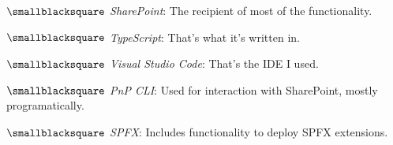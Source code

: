 \documentclass[10mm,letterpaper,notitlepage]{article}
\begin{document}
{{								\nopagebreak
								$\smallblacksquare$ \textit{SharePoint}: The recipient of most of the functionality.
								
								$\smallblacksquare$ \textit{TypeScript}: That's what it's written in.
								
								$\smallblacksquare$ \textit{Visual Studio Code}: That's the IDE I used.
								
								$\smallblacksquare$ \textit{PnP CLI}: Used for interaction with SharePoint, mostly programatically.
								
								$\smallblacksquare$ \textit{SPFX}: Includes functionality to deploy SPFX extensions.
								
								\setlength{\parindent}{\parindent-4mm}
							\par}
					\setlength{\parindent}{\parindent-4mm}
				\setlength{\parindent}{\parindent-4mm}
			\par}
\end{document}
